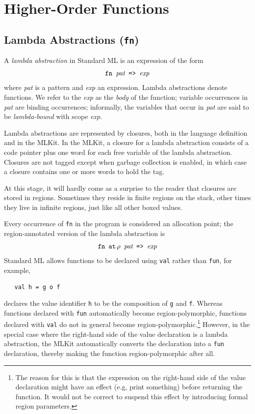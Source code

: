 \documentclass[12pt]{book}
\begin{document}
\chapter{Higher-Order Functions}
\label{hof.sec}

\section{Lambda Abstractions (\texttt{fn})}
A {\em lambda abstraction\/} 
%
%
in Standard ML is an expression of the form
$$\hbox{\tt fn {\it pat} => {\it exp}}$$
where {\it pat\/} is a pattern
and {\it exp\/} an expression.  Lambda abstractions denote functions.
We refer to the {\it exp\/} as the {\em body\/} of the function;
variable occurrences in {\it pat\/} are binding occurrences;
informally, the variables that occur in {\it pat\/} are said to be
%
{\em lambda-bound\/} with scope {\it exp}.

Lambda abstractions are represented by closures, both in the language
definition and in the MLKit. In the MLKit, a closure for a lambda
abstraction consists of a code pointer plus one word for each free
variable of the lambda abstraction. Closures are not tagged except
when garbage collection is enabled, in which case a closure contains
one or more words to hold the tag.

At this stage, it will hardly come as a surprise to the reader that
closures are stored in regions.  Sometimes they reside in finite
regions on the stack, other times they live in infinite regions, just
like all other boxed values.

Every occurrence of {\tt fn} 
%
in the program is considered an allocation point; the region-annotated
version of the lambda abstraction is
$$\hbox{\tt fn $\mathbin{\hbox{\tt at}}\,\rho$ {\it pat} => {\it exp}}$$
Standard ML allows
functions to be declared using {\tt val} rather than {\tt fun}, for
example,
\begin{verbatim}
   val h = g o f
\end{verbatim}
declares the value identifier {\tt h} to be the composition of {\tt g}
and {\tt f}.  Whereas functions declared with
%
{\tt fun} automatically become region-polymorphic, functions
declared with 
%
{\tt val} do not in general become
%
region-polymorphic.\footnote{The reason for this is that the
  expression on the right-hand side of the value declaration might
  have an effect (e.g, print something) before returning the function.
  It would not be correct to suspend this effect by introducing formal
  region parameters.} However, in the special case where the
right-hand side of the value declaration is a
%
lambda abstraction, the MLKit automatically converts the declaration
into a {\tt fun} declaration, thereby making the function
region-polymorphic after all.
\end{document}
